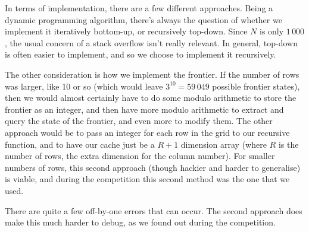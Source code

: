 In terms of implementation, there are a few different approaches. Being a
dynamic programming algorithm, there's always the question of whether we
implement it iteratively bottom-up, or recursively top-down. Since $N$ is only
$1\,000$, the usual concern of a stack overflow isn't really relevant. In
general, top-down is often easier to implement, and so we choose to implement
it recursively.

The other consideration is how we implement the frontier. If the number of rows
was larger, like 10 or so (which would leave $3^{10} = 59\,049$ possible
frontier states), then we would almost certainly have to do some modulo
arithmetic to store the frontier as an integer, and then have more modulo
arithmetic to extract and query the state of the frontier, and even more to
modify them. The other approach would be to pass an integer for each row in the
grid to our recursive function, and to have our cache just be a $R + 1$
dimension array (where $R$ is the number of rows, the extra dimension for the
column number). For smaller numbers of rows, this second approach (though
hackier and harder to generalise) is viable, and during the competition this
second method was the one that we used.

There are quite a few off-by-one errors that can occur. The second approach
does make this much harder to debug, as we found out during the competition.
